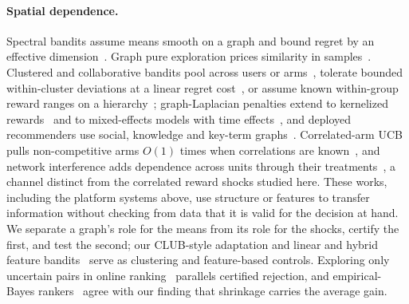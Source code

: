 \documentclass[sigconf,review,anonymous]{acmart}
\begin{document}
\paragraph{Spatial dependence.} Spectral bandits assume means smooth on a graph and bound regret by an effective dimension~\cite{valko2014spectral,kocak2020spectral}. Graph pure exploration prices similarity in samples~\cite{thaker2022graph}. Clustered and collaborative bandits pool across users or arms~\cite{gentile2014clustering,carlsson2021clustered,ban2021local,wu2016collaborative,li2025demystifying,ban2024meta,su2025sere}, tolerate bounded within-cluster deviations at a linear regret cost~\cite{wang2023misspecified}, or assume known within-group reward ranges on a hierarchy~\cite{eldowa2026similarities}; graph-Laplacian penalties extend to kernelized rewards~\cite{wu2026laplacian} and to mixed-effects models with time effects~\cite{huch2024rome}, and deployed recommenders use social, knowledge and key-term graphs~\cite{zhao2022knowledge,wu2020graphneural,zhang2020conversational,li2025evoi}. Correlated-arm UCB pulls non-competitive arms $O(1)$ times when correlations are known~\cite{gupta2021correlated}, and network interference adds dependence across units through their treatments~\cite{faruk2025spillover,agarwal2024interference,jia2025interference,wang2025designbased}, a channel distinct from the correlated reward shocks studied here. These works, including the platform systems above, use structure or features to transfer information without checking from data that it is valid for the decision at hand. We separate a graph's role for the means from its role for the shocks, certify the first, and test the second; our CLUB-style adaptation and linear and hybrid feature bandits~\cite{li2010linucb} serve as clustering and feature-based controls. Exploring only uncertain pairs in online ranking~\cite{jia2021pairrank} parallels certified rejection, and empirical-Bayes rankers~\cite{yang2024empirical} agree with our finding that shrinkage carries the average gain.
\end{document}
